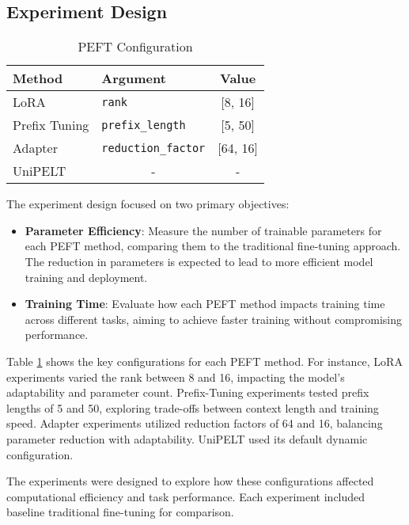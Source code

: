 \subsection{Experiment Design}

\begin{table}[htbp]
    \centering
    \caption{PEFT Configuration}
    \label{table:peft-configuration}
    \begin{tabular}{l|l|c}
        \toprule
        \textbf{Method} & \textbf{Argument} & \textbf{Value} \\
        \midrule
        LoRA & \texttt{rank} & [8, 16] \\
        Prefix Tuning & \texttt{prefix\_length} & [5, 50] \\
        Adapter & \texttt{reduction\_factor} & [64, 16] \\
        UniPELT & \multicolumn{1}{c|}{-}  & - \\
        \bottomrule
    \end{tabular}
\end{table}

The experiment design focused on two primary objectives:
\begin{itemize}
    \item \textbf{Parameter Efficiency}: Measure the number of trainable parameters for each PEFT method, comparing them to the traditional fine-tuning approach. The reduction in parameters is expected to lead to more efficient model training and deployment.
    \item \textbf{Training Time}: Evaluate how each PEFT method impacts training time across different tasks, aiming to achieve faster training without compromising performance.
\end{itemize}

Table \ref{table:peft-configuration} shows the key configurations for each PEFT method. For instance, LoRA experiments varied the rank between 8 and 16, impacting the model's adaptability and parameter count. Prefix-Tuning experiments tested prefix lengths of 5 and 50, exploring trade-offs between context length and training speed. Adapter experiments utilized reduction factors of 64 and 16, balancing parameter reduction with adaptability. UniPELT used its default dynamic configuration.

The experiments were designed to explore how these configurations affected computational efficiency and task performance. Each experiment included baseline traditional fine-tuning for comparison.


